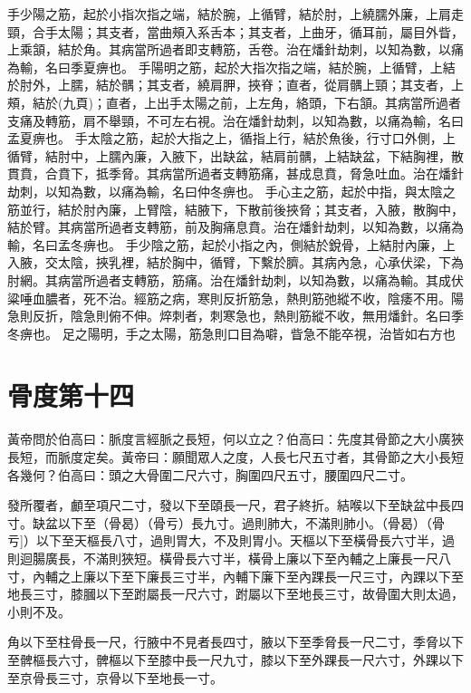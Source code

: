 手少陽之筋，起於小指次指之端，結於腕，上循臂，結於肘，上繞臑外廉，上肩走頸，合手太陽；其支者，當曲頰入系舌本；其支者，上曲牙，循耳前，屬目外眥，上乘頷，結於角。其病當所過者即支轉筋，舌卷。治在燔針劫刺，以知為數，以痛為輸，名曰季夏痹也。
手陽明之筋，起於大指次指之端，結於腕，上循臂，上結於肘外，上臑，結於髃；其支者，繞肩胛，挾脊；直者，從肩髃上頸；其支者，上頰，結於(九頁)；直者，上出手太陽之前，上左角，絡頭，下右頷。其病當所過者支痛及轉筋，肩不舉頸，不可左右視。治在燔針劫刺，以知為數，以痛為輸，名曰孟夏痹也。
手太陰之筋，起於大指之上，循指上行，結於魚後，行寸口外側，上循臂，結肘中，上臑內廉，入腋下，出缺盆，結肩前髃，上結缺盆，下結胸裡，散貫賁，合賁下，抵季脅。其病當所過者支轉筋痛，甚成息賁，脅急吐血。治在燔針劫刺，以知為數，以痛為輸，名曰仲冬痹也。
手心主之筋，起於中指，與太陰之筋並行，結於肘內廉，上臂陰，結腋下，下散前後挾脅；其支者，入腋，散胸中，結於臂。其病當所過者支轉筋，前及胸痛息賁。治在燔針劫刺，以知為數，以痛為輸，名曰孟冬痹也。
手少陰之筋，起於小指之內，側結於銳骨，上結肘內廉，上入腋，交太陰，挾乳裡，結於胸中，循臂，下繫於臍。其病內急，心承伏梁，下為肘網。其病當所過者支轉筋，筋痛。治在燔針劫刺，以知為數，以痛為輸。其成伏粱唾血膿者，死不治。經筋之病，寒則反折筋急，熱則筋弛縱不收，陰痿不用。陽急則反折，陰急則俯不伸。焠刺者，刺寒急也，熱則筋縱不收，無用燔針。名曰季冬痹也。
足之陽明，手之太陽，筋急則口目為噼，眥急不能卒視，治皆如右方也




\section{骨度第十四}

黃帝問於伯高曰：脈度言經脈之長短，何以立之？伯高曰：先度其骨節之大小廣狹長短，而脈度定矣。黃帝曰：願聞眾人之度，人長七尺五寸者，其骨節之大小長短各幾何？伯高曰：頭之大骨圍二尺六寸，胸圍四尺五寸，腰圍四尺二寸。

發所覆者，顱至項尺二寸，發以下至頤長一尺，君子終折。結喉以下至缺盆中長四寸。缺盆以下至（骨曷）（骨亏）長九寸。過則肺大，不滿則肺小。（骨曷）（骨亏]）以下至天樞長八寸，過則胃大，不及則胃小。天樞以下至橫骨長六寸半，過則迴腸廣長，不滿則狹短。橫骨長六寸半，橫骨上廉以下至內輔之上廉長一尺八寸，內輔之上廉以下至下廉長三寸半，內輔下廉下至內踝長一尺三寸，內踝以下至地長三寸，膝膕以下至跗屬長一尺六寸，跗屬以下至地長三寸，故骨圍大則太過，小則不及。

角以下至柱骨長一尺，行腋中不見者長四寸，腋以下至季脅長一尺二寸，季脅以下至髀樞長六寸，髀樞以下至膝中長一尺九寸，膝以下至外踝長一尺六寸，外踝以下至京骨長三寸，京骨以下至地長一寸。

